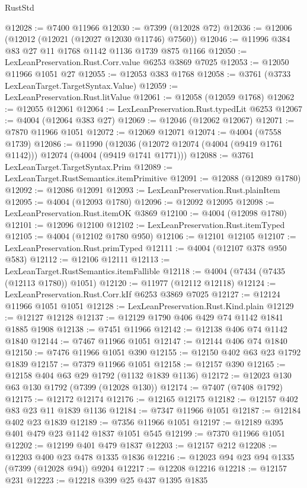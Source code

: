 \begin{lexlean}{RustStd}
\begin{coremodule}
@12028 := @7400 @11966
@12030 := @7399 (@12028 @72)
@12036 := @12006 (@12012 (@12021 (@12027 @12030 @11746) @7560))
@12046 := @11996 @384 @83 @27 @11 @1768 @1142 @1136 @1739 @875 @1166
@12050 := LexLeanPreservation.Rust.Corr.value @6253 @3869 @7025
@12053 := @12050 @11966 @1051 @27
@12055 := @12053 @383 @1768
@12058 := @3761 (@3733 LexLeanTarget.TargetSyntax.Value)
@12059 := LexLeanPreservation.Rust.litValue
@12061 := @12058 (@12059 @1768)
@12062 := @12055 @12061
@12064 := LexLeanPreservation.Rust.typedLit @6253
@12067 := @4004 (@12064 @383 @27)
@12069 := @12046 (@12062 @12067)
@12071 := @7870 @11966 @1051
@12072 := @12069 @12071
@12074 := @4004 (@7558 @1739)
@12086 := @11990
    (@12036 (@12072 @12074 (@4004 (@9419 @1761 @1142))) @12074 (@4004 (@9419 @1741 @1771)))
@12088 := @3761 LexLeanTarget.TargetSyntax.Prim
@12089 := LexLeanTarget.RustSemantics.itemPrimitive
@12091 := @12088 (@12089 @1780)
@12092 := @12086 @12091
@12093 := LexLeanPreservation.Rust.plainItem
@12095 := @4004 (@12093 @1780)
@12096 := @12092 @12095
@12098 := LexLeanPreservation.Rust.itemOK @3869
@12100 := @4004 (@12098 @1780)
@12101 := @12096 @12100
@12102 := LexLeanPreservation.Rust.itemTyped
@12105 := @4004 (@12102 @1780 @950)
@12106 := @12101 @12105
@12107 := LexLeanPreservation.Rust.primTyped
@12111 := @4004 (@12107 @378 @950 @583)
@12112 := @12106 @12111
@12113 := LexLeanTarget.RustSemantics.itemFallible
@12118 := @4004 (@7434 (@7435 (@12113 @1780)) @1051)
@12120 := @11977 (@12112 @12118)
@12124 := LexLeanPreservation.Rust.Corr.kIf @6253 @3869 @7025
@12127 := @12124 @11966 @1051 @1051
@12128 := LexLeanPreservation.Rust.Kind.plain
@12129 := @12127 @12128
@12137 := @12129 @1790 @406 @429 @74 @1142 @1841 @1885 @1908
@12138 := @7451 @11966
@12142 := @12138 @406 @74 @1142 @1840
@12144 := @7467 @11966 @1051
@12147 := @12144 @406 @74 @1840
@12150 := @7476 @11966 @1051 @390
@12155 := @12150 @402 @63 @23 @1792 @1839
@12157 := @7379 @11966 @1051
@12158 := @12157 @390
@12165 := @12158 @404 @63 @29 @1792 (@1132 @1839 @1136)
@12172 := @12023 @130 @63 @130 @1792 (@7399 (@12028 @130))
@12174 := @7407 (@7408 @1792)
@12175 := @12172 @12174
@12176 := @12165 @12175
@12182 := @12157 @402 @83 @23 @11 @1839 @1136
@12184 := @7347 @11966 @1051
@12187 := @12184 @402 @23 @1839
@12189 := @7356 @11966 @1051
@12197 := @12189 @395 @401 @479 @23 @1142 @1837 @1051 @545
@12199 := @7370 @11966 @1051
@12202 := @12199 @401 @479 @1837
@12203 := @12157 @212
@12208 := @12203 @400 @23 @478 @1335 @1836
@12216 := @12023 @94 @23 @94 @1335 (@7399 (@12028 @94)) @9204
@12217 := @12208 @12216
@12218 := @12157 @231
@12223 := @12218 @399 @25 @437 @1395 @1835

\end{coremodule}
\end{lexlean}
